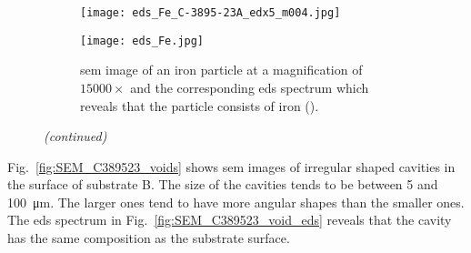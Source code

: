 %
\begin{figure}[htbp]
\ContinuedFloat
    \centering
    \begin{subfigure}[t]{\textwidth}
          \begin{minipage}[t]{0.49\linewidth}
            \centering
            \texttt{[image: eds\_Fe\_C-3895-23A\_edx5\_m004.jpg]}
          \end{minipage}
          \hfill
          \begin{minipage}[t]{0.49\linewidth}
            \centering
            \texttt{[image: eds\_Fe.jpg]}
          \end{minipage}
    \caption{\Ac{sem} image of an iron particle at a magnification of $15000\times$ and the corresponding \ac{eds} spectrum which reveals that the particle consists of iron ().}\label{fig:subBa_partice_Fe}
    \end{subfigure}%
    \captionsetup{list=no}
    \caption{\emph{(continued)}}
\end{figure}

Fig.~\ref{fig:SEM_C389523_voids} shows \ac{sem} images of irregular shaped cavities in the surface of substrate B. The size of the cavities tends to be between \SI{5}{} and \SI{100}{\micro\metre}. The larger ones tend to have more angular shapes than the smaller ones. The \ac{eds} spectrum in Fig.~\ref{fig:SEM_C389523_void_eds} reveals that the cavity has the same composition as the substrate surface.

